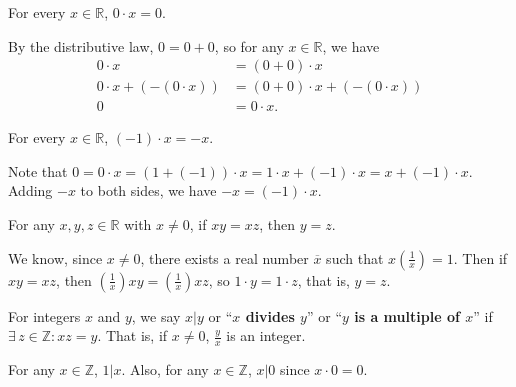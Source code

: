 \documentclass{notes}
\begin{document}
\begin{lem}
  For every $x \in \mathbb R$, $0 \cdot x = 0$.
\end{lem}

\begin{prf}
  By the distributive law, $0 = 0 + 0$, so for any $x \in \mathbb R$, we have 
  \begin{align*}
    0 \cdot x &= (0 + 0) \cdot x \\ 
    0 \cdot x + (-(0 \cdot x)) &= (0 + 0) \cdot x + (-(0 \cdot x)) \\ 
    0 &= 0 \cdot x.
  \end{align*}
\end{prf}

\begin{lem}
  For every $x \in \mathbb R$, $(-1) \cdot x = -x$.
\end{lem}

\begin{prf}
  Note that $0 = 0 \cdot x = (1 + (-1)) \cdot x = 1 \cdot x + (-1) \cdot x = x + (-1) \cdot x$.
  Adding $-x$ to both sides, we have $-x = (-1) \cdot x$.
\end{prf}

\begin{lem}
  For any $x, y, z \in \mathbb R$ with $x \neq 0$, if $x y = x z$, then $y = z$.
\end{lem}

\begin{prf}
  We know, since $x \neq 0$, there exists a real number $\overline x$ such that $x \left ( \frac{1}{x} \right ) = 1$.
  Then if $x y = x z$, then $\left ( \frac{1}{x} \right ) x y = \left ( \frac{1}{x} \right ) x z$, so $1 \cdot y = 1 \cdot z$, that is, $y = z$.
\end{prf}

\underline{}

\begin{defn}
  For integers $x$ and $y$, we say {\boldmath \bfseries $x \vert y$} or ``{\boldmath \bfseries $x$ divides $y$}'' or ``{\boldmath \bfseries $y$ is a multiple of $x$}'' if $\exists \, z \in \mathbb Z: x z = y$.
  That is, if $x \neq 0$, $\frac{y}{x}$ is an integer.
\end{defn}

\begin{rmk}
  For any $x \in \mathbb Z$, $1 \vert x$.
  Also, for any $x \in \mathbb Z$, $x \vert 0$ since $x \cdot 0 = 0$.
\end{rmk}
\end{document}
